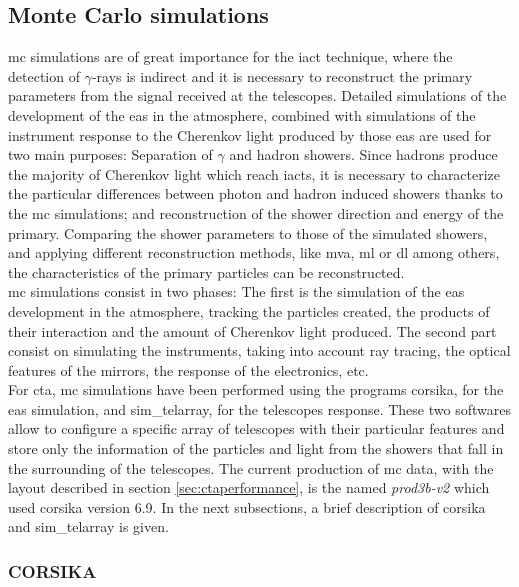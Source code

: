 \documentclass[main.tex]{subfiles}
\begin{document}
\subsection{Monte Carlo simulations}

\gls{mc} simulations are of great importance for the \gls{iact} technique, where the detection of $\gamma$-rays is indirect and it is necessary to reconstruct the primary parameters from the signal received at the telescopes. Detailed simulations of the development of the \gls{eas} in the atmosphere, combined with simulations of the instrument response to the Cherenkov light produced by those \gls{eas} are used for two main purposes: Separation of $\gamma$ and hadron showers. Since hadrons produce the majority of Cherenkov light which reach \glspl{iact}, it is necessary to characterize the particular differences between photon and hadron induced showers thanks to the \gls{mc} simulations; and reconstruction of the shower direction and energy of the primary. Comparing the shower parameters to those of the simulated showers, and applying different  reconstruction methods, like \gls{mva}, \gls{ml} or \gls{dl} among others, the characteristics of the primary particles can be reconstructed.\\
\gls{mc} simulations consist in two phases: The first is the simulation of the \gls{eas} development in the atmosphere, tracking the particles created, the products of their interaction and the amount of Cherenkov light produced. The second part consist on simulating the instruments, taking into account ray tracing, the optical features of the mirrors, the response of the electronics, etc.\\
For \gls{cta}, \gls{mc} simulations have been performed using the programs \gls{corsika}, for the \gls{eas} simulation, and sim\_telarray, for the telescopes response. These two softwares allow to configure a specific array of telescopes with their particular features and store only the information of the particles and light from the showers that fall in the surrounding of the telescopes. The current production of \gls{mc} data, with the layout described in section \ref{sec:ctaperformance}, is the named \textit{prod3b-v2} which used \gls{corsika} version 6.9. In the next subsections, a brief description of \gls{corsika} and sim\_telarray is given.

\subsubsection{CORSIKA}
\end{document}
